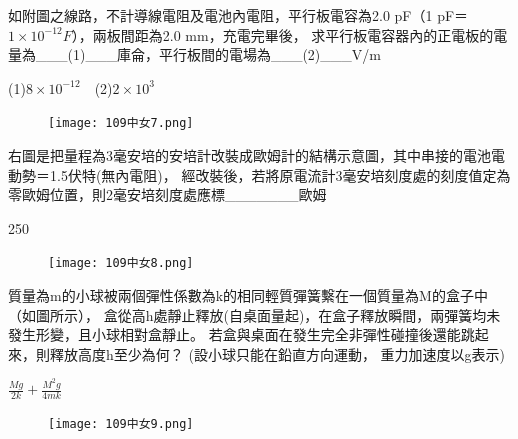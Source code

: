 \documentclass[cn,10pt,math=newtx,chinesefont=founder,device=ig]{elegantbook}
\begin{document}
\begin{example}
  如附圖之線路，不計導線電阻及電池內電阻，平行板電容為2.0 pF（1 pF＝$1\times 10^{-12}F$），兩板間距為2.0 mm，充電完畢後，
  求平行板電容器內的正電板的電量為\_\_\_(1)\_\_\_庫侖，平行板間的電場為\_\_\_(2)\_\_\_V/m\\
  \rightline{[台中女中教甄109]}
\end{example}
\begin{solution}
  (1)$8\times 10^{-12}$\ \ (2)$2\times 10^3$
\end{solution}
\begin{figure}[htbp]
  \flushright
  \texttt{[image: 109中女7.png]}
\end{figure}
\newpage
\begin{example}
  右圖是把量程為3毫安培的安培計改裝成歐姆計的結構示意圖，其中串接的電池電動勢＝1.5伏特(無內電阻)，
  經改裝後，若將原電流計3毫安培刻度處的刻度值定為零歐姆位置，則2毫安培刻度處應標\_\_\_\_\_\_\_歐姆\\
  \rightline{[台中女中教甄109]} 
\end{example}
\begin{solution}
  250
\end{solution}
\begin{figure}[htbp]
  \flushright
  \texttt{[image: 109中女8.png]}
\end{figure}
\newpage
\begin{example}
  質量為m的小球被兩個彈性係數為k的相同輕質彈簧繫在一個質量為M的盒子中（如圖所示），
  盒從高h處靜止釋放(自桌面量起)，在盒子釋放瞬間，兩彈簧均未發生形變，且小球相對盒靜止。
  若盒與桌面在發生完全非彈性碰撞後還能跳起來，則釋放高度h至少為何？
  (設小球只能在鉛直方向運動， 重力加速度以g表示)\\ 
  \rightline{[台中女中教甄109]} 
\end{example}
\begin{solution}
  $\frac{Mg}{2k}+\frac{M^2 g}{4mk}$
\end{solution}
\begin{figure}[htbp]
  \flushright
  \texttt{[image: 109中女9.png]}
\end{figure}
\newpage
\end{document}
